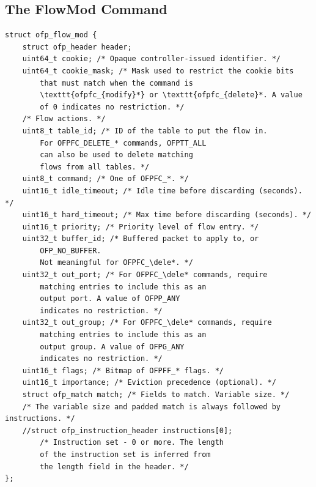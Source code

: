\documentclass[conference]{sigcomm-alternate}
\newcommand{\dele}{\textbf{delete}\xspace}
\begin{document}
{

}

\clearpage

\onecolumn

\begin{appendix}

\section{The FlowMod Command}

\begin{lstlisting}
struct ofp_flow_mod {
	struct ofp_header header;
	uint64_t cookie; /* Opaque controller-issued identifier. */
	uint64_t cookie_mask; /* Mask used to restrict the cookie bits
		that must match when the command is
		\texttt{ofpfc_{modify}*} or \texttt{ofpfc_{delete}*. A value
		of 0 indicates no restriction. */
	/* Flow actions. */
	uint8_t table_id; /* ID of the table to put the flow in.
		For OFPFC_DELETE_* commands, OFPTT_ALL
		can also be used to delete matching
		flows from all tables. */
	uint8_t command; /* One of OFPFC_*. */
	uint16_t idle_timeout; /* Idle time before discarding (seconds). */
	uint16_t hard_timeout; /* Max time before discarding (seconds). */
	uint16_t priority; /* Priority level of flow entry. */
	uint32_t buffer_id; /* Buffered packet to apply to, or
		OFP_NO_BUFFER.
		Not meaningful for OFPFC_\dele*. */
	uint32_t out_port; /* For OFPFC_\dele* commands, require
		matching entries to include this as an
		output port. A value of OFPP_ANY
		indicates no restriction. */
	uint32_t out_group; /* For OFPFC_\dele* commands, require
		matching entries to include this as an
		output group. A value of OFPG_ANY
		indicates no restriction. */
	uint16_t flags; /* Bitmap of OFPFF_* flags. */
	uint16_t importance; /* Eviction precedence (optional). */
	struct ofp_match match; /* Fields to match. Variable size. */
	/* The variable size and padded match is always followed by instructions. */
	//struct ofp_instruction_header instructions[0];
		/* Instruction set - 0 or more. The length
		of the instruction set is inferred from
		the length field in the header. */
};
\end{lstlisting}



\end{appendix}
\end{document}
